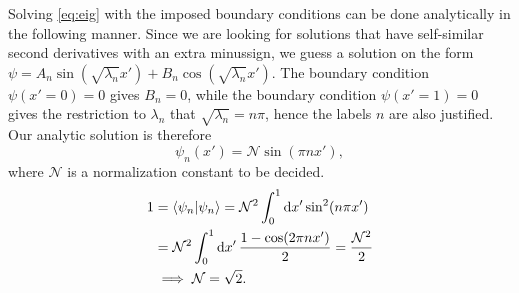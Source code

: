 Solving \cref{eq:eig} with the imposed boundary conditions can be done analytically in the following manner.
Since we are looking for solutions that have self-similar second derivatives with an extra minussign, we guess a solution on the form 
$\psi = A_n\sin(\sqrt{\lambda_n}x') + B_n\cos(\sqrt{\lambda_n}x')$. The boundary condition $\psi(x'=0) = 0$ gives $B_n = 0$, while the boundary condition $\psi(x'=1) = 0$ gives the restriction to $\lambda_n$ that $\sqrt{\lambda_n} = n\pi$, hence the labels $n$ are also justified. Our analytic solution is therefore 
\begin{equation}
\psi_n(x') = \mathcal{N}\sin(\pi n x'),
\end{equation} 
where $\mathcal{N}$ is a normalization constant to be decided.
\begin{align*} 
1 &= \braket{\psi_n}{\psi_n} = \mathcal{N}^2\int_{0}^{1}\dd{x'}\sin[2](n\pi x') \\
&=\mathcal{N}^2\int_0^1\dd{x'}\frac{1-\cos(2\pi n x')}{2}
= \frac{\mathcal{N}^2}{2} \\
&\implies \mathcal{N} = \sqrt{2}.
\end{align*}